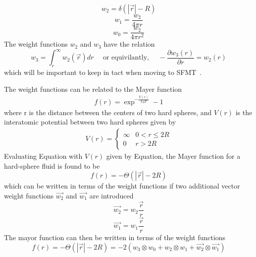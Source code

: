 \documentclass[double,12pt]{beavtex}
\begin{document}
\begin{equation}\label{eq:w2}{w_{2}=\delta(|\vec{r}|-R)}\end{equation}
\begin{equation}\label{eq:w1}{w_{1}=\frac{w_{2}}{4\pi{r}}}\end{equation}
\begin{equation}\label{eq:w0}{w_{0}=\frac{w_{2}}{4\pi{r}^2}}\end{equation}
The weight functions $w_{2}$ and $w_{3}$ have the relation
\begin{equation}\label{w2_w3_relation}{w_{3}=\int_{r}^{\infty}{w_{2}(\vec{r})dr}\mbox{~~~~or equivilantly,~~~~}-\frac{\partial{w_3(r)}}{\partial{r}}=w_2(r)}\end{equation}
which will be important to keep in tact when moving to SFMT~\cite{schmidt1999density}.

The weight functions can be related to the Mayer function 
\begin{align}
     f(r)=\exp^{-\frac{V(r)}{k_{B}T}}-1
\end{align} 
where r is the distance between the centers of two hard spheres, and 
$V(r)$ is the interatomic potential between two hard spheres given by 
\begin{align}
    V(r)=\left\{ \begin{array}{rc} \infty & 0<r \leq 2R \\ 0  & r>2R \end{array}\right.
\end{align}
Evaluating Equation with $V(r)$ given by Equation,  
the Mayer function for a hard-sphere fluid is found to be
\begin{equation}\label{f(r)step}{f(r)=-\Theta(|\vec{r}|-2R)}\end{equation} 
which can be written in terms of the weight functions if two 
additional vector weight functions $\vec{w_2}$ and $\vec{w_1}$ are introduced
\begin{equation}\label{eq:w_v2}{\vec{w_{2}}=w_{2}\frac{\vec{r}}{r}}\end{equation}
\begin{equation}\label{eq:w_v1}{\vec{w_{1}}=w_{1}\frac{\vec{r}}{r}}\end{equation} 
The mayor function can then be written in terms of the weight functions~\cite{Hansen}
\begin{equation}\label{mayer_deconvolution}{f(r)=-\Theta(|\vec{r}|-2R)= -2(w_3 \otimes w_0 + w_2 \otimes w_1 + \vec{w_2} \otimes \vec{w_1})}\end{equation}  
\end{document}
